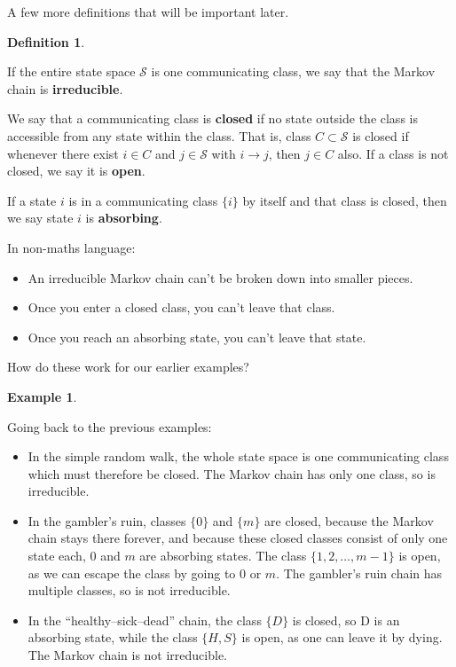 \documentclass[
  a4paper,
]{article}
\providecommand{\tightlist}{%
  \setlength{\itemsep}{0pt}\setlength{\parskip}{0pt}}
\theoremstyle{definition}
\newtheorem{definition}{Definition}[section]
\theoremstyle{definition}
\newtheorem{example}{Example}[section]
\theoremstyle{definition}
\theoremstyle{remark}
\begin{document}
A few more definitions that will be important later.

\begin{definition}
\protect\hypertarget{def:irreducible}{}\label{def:irreducible}

If the entire state space \(\mathcal S\) is one communicating class, we say that the Markov chain is \textbf{irreducible}.

We say that a communicating class is \textbf{closed} if no state outside the class is accessible from any state within the class. That is, class \(C \subset \mathcal S\) is closed if whenever there exist \(i \in C\) and \(j \in \mathcal S\) with \(i \to j\), then \(j \in C\) also. If a class is not closed, we say it is \textbf{open}.

If a state \(i\) is in a communicating class \(\{i\}\) by itself and that class is closed, then we say state \(i\) is \textbf{absorbing}.

\end{definition}

In non-maths language:

\begin{itemize}
\tightlist
\item
  An irreducible Markov chain can't be broken down into smaller pieces.
\item
  Once you enter a closed class, you can't leave that class.
\item
  Once you reach an absorbing state, you can't leave that state.
\end{itemize}

How do these work for our earlier examples?

\begin{example}
\protect\hypertarget{exm:ex-irred}{}\label{exm:ex-irred}

Going back to the previous examples:

\begin{itemize}
\tightlist
\item
  In the simple random walk, the whole state space is one communicating class which must therefore be closed. The Markov chain has only one class, so is irreducible.
\item
  In the gambler's ruin, classes \(\{0\}\) and \(\{m\}\) are closed, because the Markov chain stays there forever, and because these closed classes consist of only one state each, \(0\) and \(m\) are absorbing states. The class \(\{1, 2, \dots, m-1\}\) is open, as we can escape the class by going to \(0\) or \(m\). The gambler's ruin chain has multiple classes, so is not irreducible.
\item
  In the ``healthy--sick--dead'' chain, the class \(\{D\}\) is closed, so D is an absorbing state, while the class \(\{H, S\}\) is open, as one can leave it by dying. The Markov chain is not irreducible.
\end{itemize}

\end{example}
\end{document}
